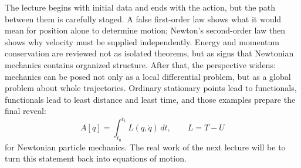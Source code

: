 The lecture begins with initial data and ends with the action, but the path between them is carefully staged. A false first-order law shows what it would mean for position alone to determine motion; Newton's second-order law then shows why velocity must be supplied independently. Energy and momentum conservation are reviewed not as isolated theorems, but as signs that Newtonian mechanics contains organized structure. After that, the perspective widens: mechanics can be posed not only as a local differential problem, but as a global problem about whole trajectories. Ordinary stationary points lead to functionals, functionals lead to least distance and least time, and those examples prepare the final reveal:
\begin{equation}
A[q]=\int_{t_0}^{t_1}L(q,\dot q)\,dt,
\qquad
L=T-U
\end{equation}
for Newtonian particle mechanics. The real work of the next lecture will be to turn this statement back into equations of motion.